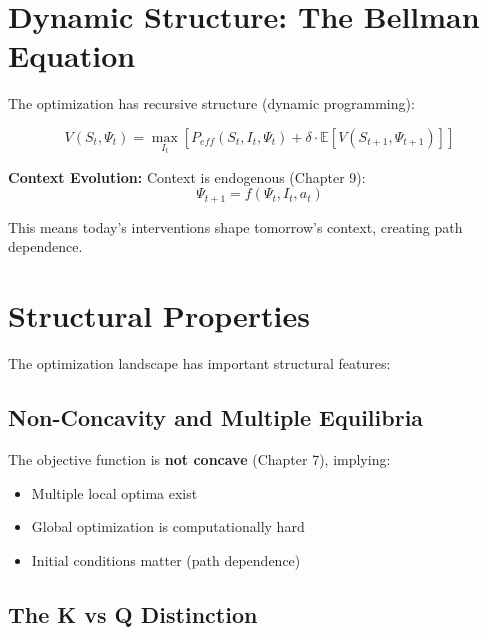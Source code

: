 \section{Dynamic Structure: The Bellman Equation}
\label{sec:25-dynamics}

The optimization has recursive structure (dynamic programming):

\begin{equation}
V(S_t, \Psi_t) = \max_{I_t} \left[ P_{eff}(S_t, I_t, \Psi_t) + \delta \cdot \mathbb{E}[V(S_{t+1}, \Psi_{t+1})] \right]
\label{eq:bellman}
\end{equation}

\textbf{Context Evolution:} Context is endogenous (Chapter 9):
\begin{equation}
\Psi_{t+1} = f(\Psi_t, I_t, a_t)
\end{equation}

This means today's interventions shape tomorrow's context, creating path dependence.


\section{Structural Properties}
\label{sec:25-properties}

The optimization landscape has important structural features:

\subsection{Non-Concavity and Multiple Equilibria}
\label{sec:25-nonconcavity}

The objective function is \textbf{not concave} (Chapter 7), implying:
\begin{itemize}
    \item Multiple local optima exist
    \item Global optimization is computationally hard
    \item Initial conditions matter (path dependence)
\end{itemize}

\subsection{The K vs Q Distinction}
\label{sec:25-kvq}

